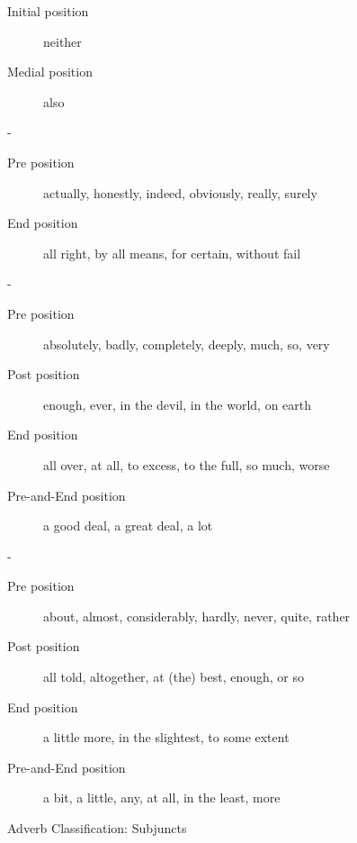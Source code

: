 \begin{figure}[htbp]
{{\begin{description}
\begin{singlespace}
\begin{description}
\begin{description}
\begin{description}
                     \item [Initial position] neither
                     \item [Medial position] also
                  \end{description}
            \end{description}
         \item [Emphasizers] - 
            \begin{description}
               \item [Pre position] actually, honestly, indeed, 
                                    obviously, really, surely
               \item [End position] all right, by all means, for certain, 
                                    without fail
            \end{description}
         \item [Amplifiers] - 
            \begin{description}
               \item [Pre position] absolutely, badly, completely, deeply, 
                                    much, so, very 
               \item [Post position] enough, ever, in the devil, in the world, 
                                     on earth
               \item [End position] all over, at all, to excess, 
                                    to the full, so much, worse
               \item [Pre-and-End position] a good deal, a great deal, a lot
            \end{description}
         \item [Downtoners] - 
            \begin{description}
               \item [Pre position] about, almost, considerably, hardly, 
                                    never, quite, rather
               \item [Post position] all told, altogether, at (the) best,
                                     enough, or so
               \item [End position] a little more, in the slightest, 
                                    to some extent
               \item [Pre-and-End position] a bit, a little, any, at all, 
                                            in the least, more
            \end{description}
      \end{description}
    \end{singlespace}
  \end{description}
}}
  \caption{Adverb Classification: Subjuncts}
  \label{fig:subjuncts}
\end{figure}

